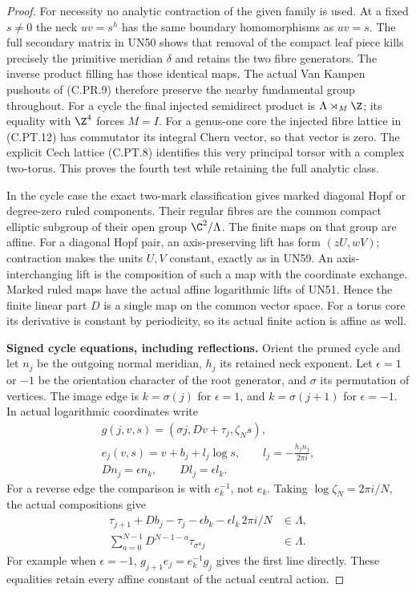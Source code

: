 \begin{proof}
For necessity no analytic contraction
of the given family is used.
At a fixed \(s\ne0\) the neck
\(uv=s^h\) has the same boundary
homomorphisms as \(uv=s\).
The full secondary matrix in UN50
shows that removal of the compact
leaf piece kills precisely the
primitive meridian \(\delta\) and
retains the two fibre generators.
The inverse product filling has
those identical maps. The actual
Van Kampen pushouts of (C.PR.9)
therefore preserve the nearby
fundamental group throughout.
For a cycle the final injected
semidirect product is
\(\Lambda\rtimes_M\Z\); its equality
with \(\Z^4\) forces \(M=I\).
For a genus-one core the injected
fibre lattice in (C.PT.12) has
commutator its integral Chern
vector, so that vector is zero.
The explicit Cech lattice
(C.PT.8) identifies this very
principal torsor with a complex
two-torus. This proves the fourth
test while retaining the full
analytic class.

In the cycle case the exact two-mark
classification gives marked diagonal
Hopf or degree-zero ruled components.
Their regular fibres are the common
compact elliptic subgroup of their
open group \(\C^2/\Lambda\).
The finite maps on that group are
affine. For a diagonal Hopf pair,
an axis-preserving lift has form
\((zU,wV)\); contraction makes
the units \(U,V\) constant, exactly
as in UN59. An axis-interchanging
lift is the composition of such
a map with the coordinate
exchange. Marked ruled maps have
the actual affine logarithmic
lifts of UN51. Hence the finite
linear part \(D\) is a single
map on the common vector space.
For a torus core its derivative
is constant by periodicity,
so its actual finite action is
affine as well.

\par\medskip\noindent\textbf{Signed cycle equations, including reflections.}
Orient the pruned cycle and let \(n_j\)
be the outgoing normal meridian,
\(h_j\) its retained neck exponent.
Let \(\epsilon=1\) or \(-1\) be the
orientation character of the root
generator, and \(\sigma\) its
permutation of vertices. The image
edge is \(k=\sigma(j)\) for
\(\epsilon=1\), and
\(k=\sigma(j+1)\) for \(\epsilon=-1\).
In actual logarithmic coordinates
write
\[
 \begin{gathered}
 g(j,v,s)=(\sigma j,Dv+\tau_j,\zeta_Ns),\\
 e_j(v,s)=v+b_j+l_j\log s,\qquad
       l_j=-\frac{h_jn_j}{2\pi i},\\
 Dn_j=\epsilon n_k,\qquad
 Dl_j=\epsilon l_k.
 \end{gathered}
 \tag{C.WT.17}
\]
For a reverse edge the comparison
is with \(e_k^{-1}\), not \(e_k\).
Taking \(\log\zeta_N=2\pi i/N\),
the actual compositions give
\[
 \begin{aligned}
 \tau_{j+1}+Db_j-\tau_j
       -\epsilon b_k-\epsilon l_k\,2\pi i/N
                                      &\in\Lambda,\\
 \sum_{a=0}^{N-1}D^{N-1-a}
                       \tau_{\sigma^a j}&\in\Lambda.
 \end{aligned}
 \tag{C.WT.18}
\]
For example when \(\epsilon=-1\),
\(g_{j+1}e_j=e_k^{-1}g_j\) gives
the first line directly. These
equalities retain every affine
constant of the actual central
action.


\end{proof}
